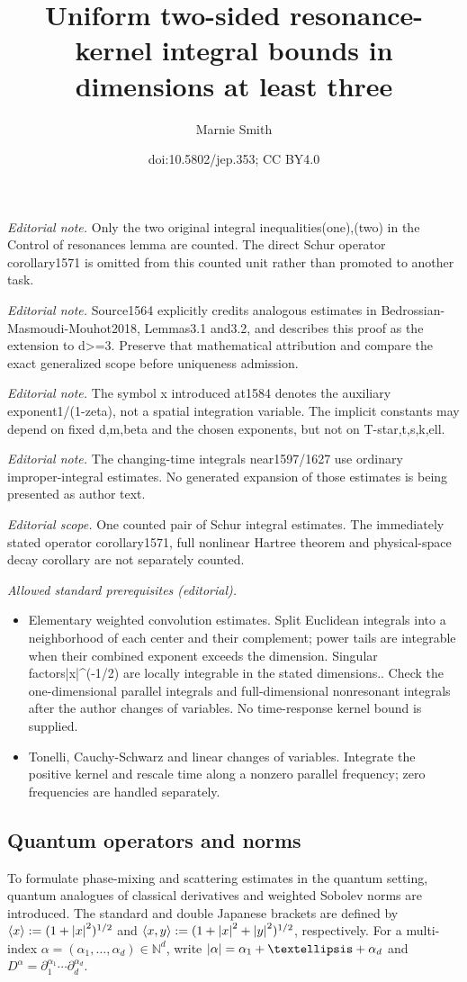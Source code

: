 \documentclass[10pt,a4paper]{article}
\title{Uniform two-sided resonance-kernel integral bounds in dimensions at least three}
\author{Marnie Smith}
\date{doi:10.5802/jep.353; CC BY4.0}
\theoremstyle{plain}
\theoremstyle{remark}
\newcommand{\p}{\partial}
\newcommand{\jb}[1]{\langle#1\rangle}
\begin{document}
\maketitle
\noindent\textit{Editorial note.} Only the two original integral inequalities(one),(two) in the Control of resonances lemma are counted. The direct Schur operator corollary1571 is omitted from this counted unit rather than promoted to another task.\par\medskip
\noindent\textit{Editorial note.} Source1564 explicitly credits analogous estimates in Bedrossian-Masmoudi-Mouhot2018, Lemmas3.1 and3.2, and describes this proof as the extension to d>=3. Preserve that mathematical attribution and compare the exact generalized scope before uniqueness admission.\par\medskip
\noindent\textit{Editorial note.} The symbol x introduced at1584 denotes the auxiliary exponent1/(1-zeta), not a spatial integration variable. The implicit constants may depend on fixed d,m,beta and the chosen exponents, but not on T-star,t,s,k,ell.\par\medskip
\noindent\textit{Editorial note.} The changing-time integrals near1597/1627 use ordinary improper-integral estimates. No generated expansion of those estimates is being presented as author text.\par\medskip
\noindent\textit{Editorial scope.} One counted pair of Schur integral estimates. The immediately stated operator corollary1571, full nonlinear Hartree theorem and physical-space decay corollary are not separately counted.\par\medskip
\noindent\textit{Allowed standard prerequisites (editorial).}\begin{itemize}
\item Elementary weighted convolution estimates. Split Euclidean integrals into a neighborhood of each center and their complement; power tails are integrable when their combined exponent exceeds the dimension. Singular factors|x|\textasciicircum{}(-1/2) are locally integrable in the stated dimensions.. Check the one-dimensional parallel integrals and full-dimensional nonresonant integrals after the author changes of variables. No time-response kernel bound is supplied.
\item Tonelli, Cauchy-Schwarz and linear changes of variables. Integrate the positive kernel and rescale time along a nonzero parallel frequency; zero frequencies are handled separately.
\end{itemize}\medskip
\subsection{Quantum operators and norms} To formulate phase-mixing and scattering estimates in the quantum setting, quantum analogues of classical derivatives and weighted Sobolev norms are introduced. The standard and double Japanese brackets are defined by $\jb{x}:=(1+\abs{x}^2)^{1/2}$ and $\jb{x,y}:=(1+\abs{x}^2+\abs{y}^2)^{1/2}$, respectively. For a multi-index $\alpha=(\alpha_1,\dots,\alpha_d)\in\mathbb N^d$, write
$\abs{\alpha}=\alpha_1+\dots+\alpha_d$ and $D^{\alpha}=\p_1^{\alpha_1}\cdots\p_d^{\alpha_d}$.
\end{document}
